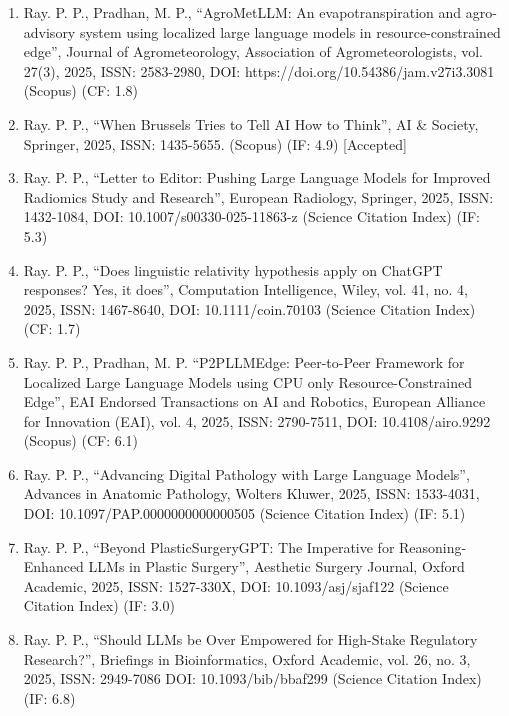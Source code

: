\documentclass[11pt,a4paper]{moderncv}
\begin{document}
\begin{adjustwidth}{6em}{0pt}
	\begin{enumerate}
		
		\item Ray. P. P., Pradhan, M. P., “AgroMetLLM: An evapotranspiration and agro-advisory system using localized large language models in resource-constrained edge”, Journal of Agrometeorology, Association of Agrometeorologists, vol. 27(3), 2025, ISSN: 2583-2980, DOI: https://doi.org/10.54386/jam.v27i3.3081 (Scopus) (CF: 1.8)
		
		\item Ray. P. P., “When Brussels Tries to Tell AI How to Think”, AI \& Society, Springer, 2025, ISSN: 1435-5655. (Scopus) (IF: 4.9) [Accepted]
		
		\item Ray. P. P., “Letter to Editor: Pushing Large Language Models for Improved Radiomics Study and Research”, European Radiology, Springer, 2025, ISSN: 1432-1084, DOI: 10.1007/s00330-025-11863-z (Science Citation Index) (IF: 5.3)
		
		\item Ray. P. P., “Does linguistic relativity hypothesis apply on ChatGPT responses? Yes, it does”, Computation Intelligence, Wiley, vol. 41, no. 4, 2025, ISSN: 1467-8640, DOI: 10.1111/coin.70103 (Science Citation Index) (CF: 1.7)
		
		\item Ray. P. P., Pradhan, M. P. “P2PLLMEdge: Peer-to-Peer Framework for Localized Large Language Models using CPU only Resource-Constrained Edge”, EAI Endorsed Transactions on AI and Robotics, European Alliance for Innovation (EAI), vol. 4, 2025, ISSN: 2790-7511, DOI: 10.4108/airo.9292 (Scopus) (CF: 6.1)
		
		\item Ray. P. P., “Advancing Digital Pathology with Large Language Models”, Advances in Anatomic Pathology, Wolters Kluwer, 2025, ISSN: 1533-4031, DOI: 10.1097/PAP.0000000000000505 (Science Citation Index) (IF: 5.1)
		
		\item Ray. P. P., “Beyond PlasticSurgeryGPT: The Imperative for Reasoning-Enhanced LLMs in Plastic Surgery”, Aesthetic Surgery Journal, Oxford Academic, 2025, ISSN: 1527-330X, DOI: 10.1093/asj/sjaf122 (Science Citation Index) (IF: 3.0)
		
		\item Ray. P. P., “Should LLMs be Over Empowered for High-Stake Regulatory Research?”, Briefings in Bioinformatics, Oxford Academic, vol. 26, no. 3, 2025, ISSN: 2949-7086 DOI: 10.1093/bib/bbaf299 (Science Citation Index) (IF: 6.8)
		

\end{enumerate}
\end{adjustwidth}
\end{document}

